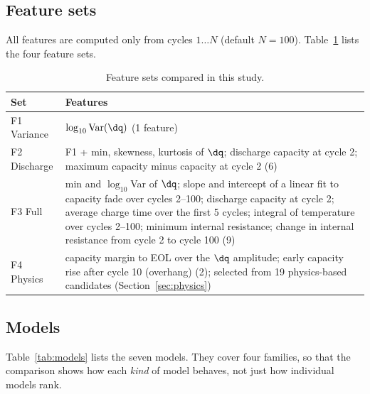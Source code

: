 \subsection{Feature sets}
All features are computed only from cycles $1\ldots N$ (default $N=100$).
Table~\ref{tab:featsets} lists the four feature sets.

\begin{table}[t]
\centering
\caption{Feature sets compared in this study.}
\label{tab:featsets}
\setlength{\tabcolsep}{3pt}
\begin{tabular}{@{}lp{}@{}}
\toprule
Set & Features \\
\midrule
F1 Variance & $\log_{10}\mathrm{Var}(\dq)$ (1 feature)~\cite{severson2019} \\
F2 Discharge & F1 + min, skewness, kurtosis of $\dq$; discharge capacity at
cycle 2; maximum capacity minus capacity at cycle 2 (6)~\cite{severson2019} \\
F3 Full & min and $\log_{10}$Var of $\dq$; slope and intercept of a linear
fit to capacity fade over cycles 2--100; discharge capacity at cycle 2;
average charge time over the first 5 cycles; integral of temperature over
cycles 2--100; minimum internal resistance; change in internal resistance
from cycle 2 to cycle 100 (9)~\cite{severson2019} \\
F4 Physics & capacity margin to EOL over the $\dq$ amplitude; early
capacity rise after cycle 10 (overhang) (2); selected from 19 physics-based
candidates (Section~\ref{sec:physics}) \\
\bottomrule
\end{tabular}
\end{table}

\subsection{Models}
Table~\ref{tab:models} lists the seven models. They cover four families, so
that the comparison shows how each \emph{kind} of model behaves, not just
how individual models rank.

